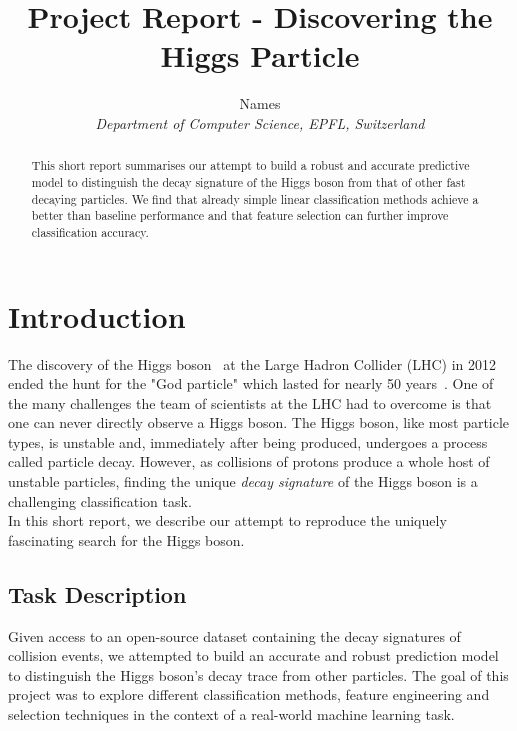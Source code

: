 \documentclass[10pt,conference,compsocconf]{IEEEtran}
\begin{document}
\title{Project Report - Discovering the Higgs Particle}

\author{
  Names\\
  \textit{Department of Computer Science, EPFL, Switzerland}
}

\maketitle

\begin{abstract}
This short report summarises our attempt to build a robust and accurate predictive model to distinguish the decay signature of the Higgs boson from that of other fast decaying particles. We find that already simple linear classification methods achieve a better than baseline performance and that feature selection can further improve classification accuracy.
\end{abstract}


\section{Introduction}

The discovery of the Higgs boson~\cite{Higgs1964} at the Large Hadron Collider (LHC) in 2012~\cite{Aad2012} ended the hunt for the "God particle" which lasted for nearly 50 years~\cite{CERN}. One of the many challenges the team of scientists at the LHC had to overcome is that one can never directly observe a Higgs boson. The Higgs boson, like most particle types, is unstable and, immediately after being produced, undergoes a process called particle decay. However, as collisions of protons produce a whole host of unstable particles, finding the unique \emph{decay signature} of the Higgs boson is a challenging classification task.\\
In this short report, we describe our attempt to reproduce the uniquely fascinating search for the Higgs boson.

\subsection{Task Description}
Given access to an open-source dataset containing the decay signatures of collision events, we attempted to build an accurate and robust prediction model to distinguish the Higgs boson's decay trace from other particles. The goal of this project was to explore different classification methods, feature engineering and selection techniques in the context of a real-world machine learning task. 
\end{document}
